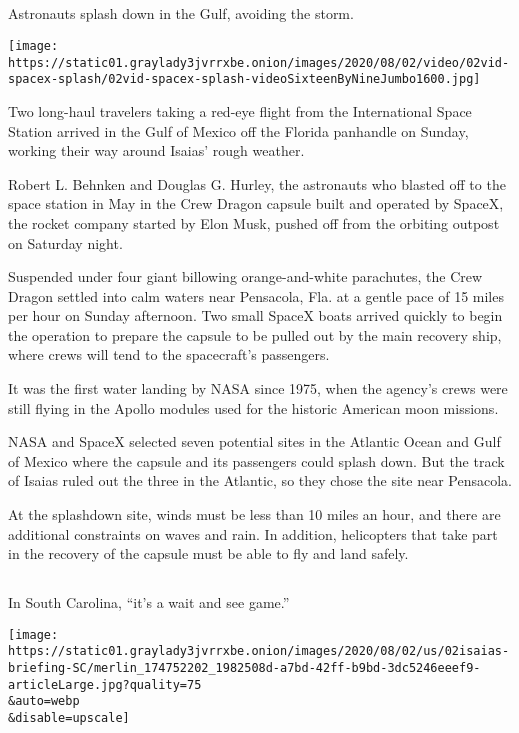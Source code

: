 \hypertarget{-1}{%
\subsection{}\label{-1}}

Astronauts splash down in the Gulf, avoiding the storm.

\texttt{[image: https://static01.graylady3jvrrxbe.onion/images/2020/08/02/video/02vid-spacex-splash/02vid-spacex-splash-videoSixteenByNineJumbo1600.jpg]}

Two long-haul travelers taking a red-eye flight from the International
Space Station arrived in the Gulf of Mexico off the Florida panhandle on
Sunday, working their way around Isaias' rough weather.

Robert L. Behnken and Douglas G. Hurley, the astronauts who blasted off
to the space station in May in the Crew Dragon capsule built and
operated by SpaceX, the rocket company started by Elon Musk, pushed off
from the orbiting outpost on Saturday night.

Suspended under four giant billowing orange-and-white parachutes, the
Crew Dragon settled into calm waters near Pensacola, Fla. at a gentle
pace of 15 miles per hour on Sunday afternoon. Two small SpaceX boats
arrived quickly to begin the operation to prepare the capsule to be
pulled out by the main recovery ship, where crews will tend to the
spacecraft's passengers.

It was the first water landing by NASA since 1975, when the agency's
crews were still flying in the Apollo modules used for the historic
American moon missions.

NASA and SpaceX selected seven potential sites in the Atlantic Ocean and
Gulf of Mexico where the capsule and its passengers could splash down.
But the track of Isaias ruled out the three in the Atlantic, so they
chose the site near Pensacola.

At the splashdown site, winds must be less than 10 miles an hour, and
there are additional constraints on waves and rain. In addition,
helicopters that take part in the recovery of the capsule must be able
to fly and land safely.

\hypertarget{-2}{%
\subsection{}\label{-2}}

In South Carolina, ``it's a wait and see game.''

\texttt{[image: https://static01.graylady3jvrrxbe.onion/images/2020/08/02/us/02isaias-briefing-SC/merlin\_174752202\_1982508d-a7bd-42ff-b9bd-3dc5246eeef9-articleLarge.jpg?quality=75\\\&auto=webp\\\&disable=upscale]}

